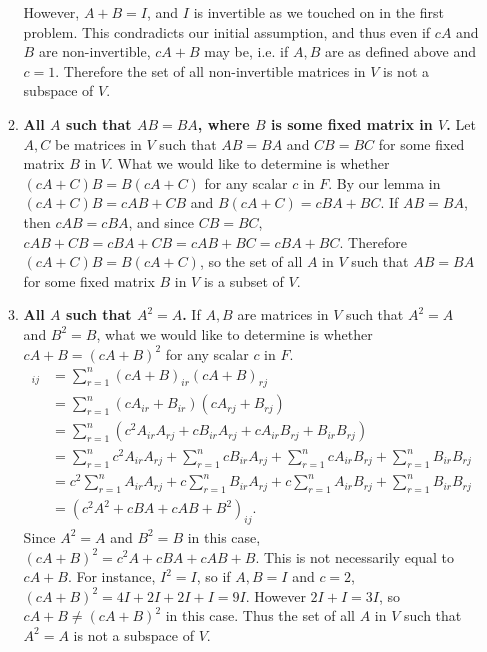 \documentclass[12pt]{article}
\begin{document}
\begin{enumerate}
\begin{enumerate}
          However, $A + B = I$, and $I$ is invertible as we touched on in the first
          problem. This condradicts our initial assumption, and thus even if $cA$ and
          $B$ are non-invertible, $cA + B$ may be, i.e. if $A,B$ are as defined above
          and $c = 1$. Therefore the set of all non-invertible matrices in $V$ is not
          a subspace of $V$.

        \item
          \textbf{All $A$ such that $AB = BA$, where $B$ is some fixed matrix in
          $V$.} Let $A,C$ be matrices in $V$ such that $AB = BA$ and $CB = BC$ for
          some fixed matrix $B$ in $V$. What we would like to determine is whether
          $(cA + C)B = B(cA + C)$ for any scalar $c$ in $F$. By our lemma in
           $(cA + C)B = cAB + CB$ and $B(cA + C) = cBA + BC$. If
          $AB = BA$, then $cAB = cBA$, and since $CB = BC$, $cAB + CB = cBA + CB =
          cAB + BC = cBA + BC$. Therefore $(cA + C)B = B(cA + C)$, so the set of all
          $A$ in $V$ such that $AB = BA$ for some fixed matrix $B$ in $V$ is a subset
          of $V$.

        \item
          \textbf{All $A$ such that $A^2 = A$.} If $A,B$ are matrices in $V$ such
          that $A^2 = A$ and $B^2 = B$, what we would like to determine is whether
          $cA + B = (cA + B)^2$ for any scalar $c$ in $F$.
          \begin{align*}
            [(cA + B)^2]_{ij}
            &= \sum_{r = 1}^{n}(cA + B)_{ir}(cA + B)_{rj}\\
            &= \sum_{r = 1}^{n}(cA_{ir} + B_{ir})(cA_{rj} + B_{rj})\\
            &= \sum_{r = 1}^{n}(c^2A_{ir}A_{rj}
              + cB_{ir}A_{rj} + cA_{ir}B_{rj} + B_{ir}B_{rj})\\
            &= \sum_{r = 1}^{n}c^2A_{ir}A_{rj} +
              \sum_{r = 1}^{n} cB_{ir}A_{rj} +
              \sum_{r = 1}^{n} cA_{ir}B_{rj} +
              \sum_{r = 1}^{n} B_{ir}B_{rj}\\
            &= c^2\sum_{r = 1}^{n}A_{ir}A_{rj} +
              c\sum_{r = 1}^{n} B_{ir}A_{rj} +
              c\sum_{r = 1}^{n} A_{ir}B_{rj} +
              \sum_{r = 1}^{n} B_{ir}B_{rj}\\
            &= (c^2A^2 + cBA + cAB + B^2)_{ij}.
          \end{align*}
          Since $A^2 = A$ and $B^2 = B$ in this case, $(cA + B)^2 = c^2A + cBA + cAB
          + B$. This is not necessarily equal to $cA + B$. For instance, $I^2 = I$,
          so if $A,B = I$ and $c = 2$, $(cA + B)^2 = 4I + 2I + 2I + I = 9I$. However
          $2I + I = 3I$, so $cA + B \neq (cA + B)^2$ in this case. Thus the set of
          all $A$ in $V$ such that $A^2 = A$ is not a subspace of $V$.
        \end{enumerate}


\end{enumerate}
\end{document}

